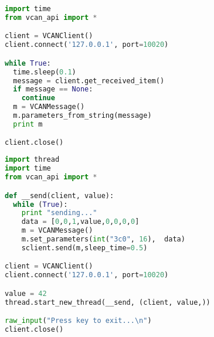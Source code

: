 \begin{lstlisting}[frame=single, language=Python, basicstyle=\footnotesize, caption={Empfangsclient via Polling}, label={lst:bsp_client2}]
import time
from vcan_api import *

client = VCANClient()
client.connect('127.0.0.1', port=10020)

while True:
  time.sleep(0.1)
  message = client.get_received_item()
  if message == None:
    continue
  m = VCANMessage()
  m.parameters_from_string(message)
  print m

client.close()
\end{lstlisting}

\begin{lstlisting}[frame=single, language=Python, basicstyle=\footnotesize, caption={Zyklisch sendender Client via Threads}, label={lst:bsp_client3}]
import thread
import time
from vcan_api import *

def __send(client, value):
  while (True):
    print "sending..."
    data = [0,0,1,value,0,0,0,0]
    m = VCANMessage()
    m.set_parameters(int("3c0", 16),  data)
    sclient.send(m,sleep_time=0.5)

client = VCANClient()
client.connect('127.0.0.1', port=10020)

value = 42
thread.start_new_thread(__send, (client, value,))

raw_input("Press key to exit...\n")
client.close()
\end{lstlisting}









